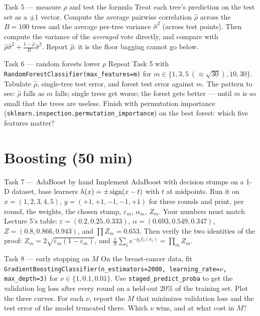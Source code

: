 \documentclass[11pt]{article}
\begin{document}
\begin{task}{Task 5 --- measure $\rho$ and test the formula}
Treat each tree's prediction on the test set as a $\pm1$ vector. Compute the average pairwise correlation
$\hat\rho$ across the $B=100$ trees and the average per-tree variance $\hat\sigma^2$ (across test points).
Then compute the variance of the \emph{averaged} vote directly, and compare with
$\hat\rho\hat\sigma^2+\frac{1-\hat\rho}{B}\hat\sigma^2$. Report $\hat\rho$: it is the floor bagging cannot go below.
\end{task}

\begin{task}{Task 6 --- random forests lower $\rho$}
Repeat Task 5 with \texttt{RandomForestClassifier(max\_features=m)} for $m\in\{1,3,5\ (\approx\sqrt{30}),10,30\}$.
Tabulate $\hat\rho$, single-tree test error, and forest test error against $m$. The pattern to see: $\hat\rho$
falls as $m$ falls; single trees get worse; the forest gets better --- until $m$ is so small that the trees are
useless. Finish with permutation importance (\texttt{sklearn.inspection.permutation\_importance}) on the best forest:
which five features matter?
\end{task}

\section{Boosting (50 min)}

\begin{task}{Task 7 --- AdaBoost by hand}
Implement AdaBoost with decision stumps on a 1-D dataset, base learners $h(x)=\pm\operatorname{sign}(x-t)$ with $t$ at
midpoints. Run it on $x=(1,2,3,4,5)$, $y=(+1,+1,-1,-1,+1)$ for three rounds and print, per round, the
weights, the chosen stump, $\varepsilon_m$, $\alpha_m$, $Z_m$. Your numbers must match Lecture 5's table:
$\varepsilon=(0.2,0.25,0.333)$, $\alpha=(0.693,0.549,0.347)$, $Z=(0.8,0.866,0.943)$, and $\prod Z_m=0.653$.
Then verify the two identities of the proof: $Z_m=2\sqrt{\varepsilon_m(1-\varepsilon_m)}$, and
$\frac1N\sum_ie^{-y_if_3(x_i)}=\prod_mZ_m$.
\end{task}

\begin{task}{Task 8 --- early stopping on $M$}
On the breast-cancer data, fit \texttt{GradientBoostingClassifier(n\_estimators=2000, learning\_rate=$\nu$,
max\_depth=3)} for $\nu\in\{1,0.1,0.01\}$. Use \texttt{staged\_predict\_proba} to get the validation log loss after
every round on a held-out 20\% of the training set. Plot the three curves. For each $\nu$, report the $M$ that
minimizes validation loss and the test error of the model truncated there. Which $\nu$ wins, and at what cost in $M$?
\end{task}
\end{document}
